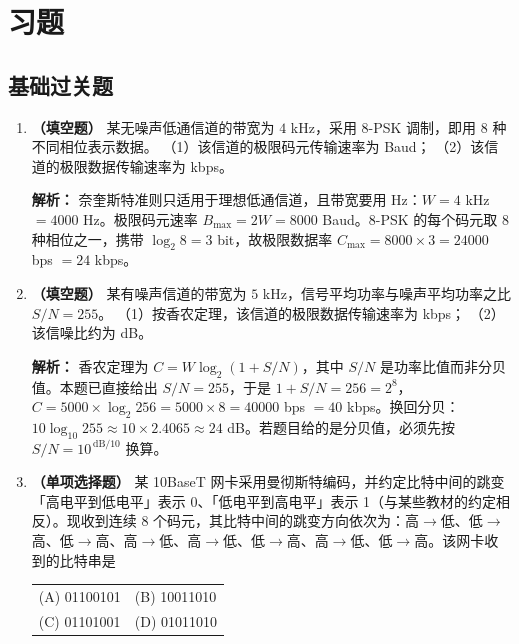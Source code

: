 \section{习题}

\subsection{基础过关题}

\begin{enumerate}

\item \textbf{（填空题）} 某无噪声低通信道的带宽为 $4$ kHz，采用 8-PSK 调制，即用 8 种不同相位表示数据。
（1）该信道的极限码元传输速率为\underline{\hspace{2.2cm}} Baud；
（2）该信道的极限数据传输速率为\underline{\hspace{2.2cm}} kbps。

\ifshowsolutions\par\noindent\textbf{解析：} 奈奎斯特准则只适用于理想低通信道，且带宽要用 Hz：$W=4$ kHz $=4000$ Hz。极限码元速率 $B_{\max}=2W=8000$ Baud。8-PSK 的每个码元取 8 种相位之一，携带 $\log_2 8=3$ bit，故极限数据率 $C_{\max}=8000\times3=24000$ bps $=24$ kbps。\else \answerarea[4] \fi

\vspace{8pt}

\item \textbf{（填空题）} 某有噪声信道的带宽为 $5$ kHz，信号平均功率与噪声平均功率之比 $S/N=255$。
（1）按香农定理，该信道的极限数据传输速率为\underline{\hspace{2.2cm}} kbps；
（2）该信噪比约为\underline{\hspace{2.2cm}} dB。

\ifshowsolutions\par\noindent\textbf{解析：} 香农定理为 $C=W\log_2(1+S/N)$，其中 $S/N$ 是功率比值而非分贝值。本题已直接给出 $S/N=255$，于是 $1+S/N=256=2^8$，$C=5000\times\log_2 256=5000\times8=40000$ bps $=40$ kbps。换回分贝：$10\log_{10}255\approx 10\times2.4065\approx24$ dB。若题目给的是分贝值，必须先按 $S/N=10^{\,\mathrm{dB}/10}$ 换算。\else \answerarea[4] \fi

\vspace{8pt}

\item \textbf{（单项选择题）} 某 10BaseT 网卡采用曼彻斯特编码，并约定比特中间的跳变「高电平到低电平」表示 0、「低电平到高电平」表示 1（与某些教材的约定相反）。现收到连续 8 个码元，其比特中间的跳变方向依次为：高$\to$低、低$\to$高、低$\to$高、高$\to$低、高$\to$低、低$\to$高、高$\to$低、低$\to$高。该网卡收到的比特串是
\begin{center}
\begin{tabular}{ll}
(A) 01100101 & (B) 10011010 \\[4pt]
(C) 01101001 & (D) 01011010
\end{tabular}
\end{center}


\end{enumerate}
